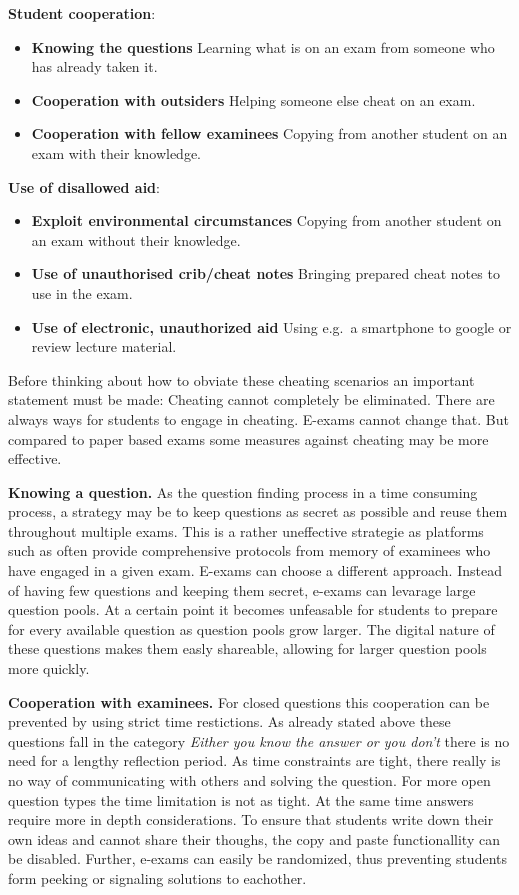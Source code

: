 \textbf{Student cooperation}:

\begin{itemize}
\tightlist
\item
  \textbf{Knowing the questions} Learning what is on an exam from
  someone who has already taken it.
\item
  \textbf{Cooperation with outsiders} Helping someone else cheat on an
  exam.
\item
  \textbf{Cooperation with fellow examinees} Copying from another
  student on an exam with their knowledge.
\end{itemize}

\textbf{Use of disallowed aid}:

\begin{itemize}
\tightlist
\item
  \textbf{Exploit environmental circumstances} Copying from another
  student on an exam without their knowledge.
\item
  \textbf{Use of unauthorised crib/cheat notes} Bringing prepared cheat
  notes to use in the exam.
\item
  \textbf{Use of electronic, unauthorized aid} Using e.g.~a smartphone
  to google or review lecture material.
\end{itemize}

Before thinking about how to obviate these cheating scenarios an
important statement must be made: Cheating cannot completely be
eliminated. There are always ways for students to engage in cheating.
E-exams cannot change that. But compared to paper based exams some
measures against cheating may be more effective.

\textbf{Knowing a question.} As the question finding process in a time
consuming process, a strategy may be to keep questions as secret as
possible and reuse them throughout multiple exams. This is a rather
uneffective strategie as platforms such as often provide comprehensive
protocols from memory of examinees who have engaged in a given exam.
E-exams can choose a different approach. Instead of having few questions
and keeping them secret, e-exams can levarage large question pools. At a
certain point it becomes unfeasable for students to prepare for every
available question as question pools grow larger. The digital nature of
these questions makes them easly shareable, allowing for larger question
pools more quickly.

\textbf{Cooperation with examinees.} For closed questions this
cooperation can be prevented by using strict time restictions. As
already stated above these questions fall in the category \emph{Either
you know the answer or you don't} there is no need for a lengthy
reflection period. As time constraints are tight, there really is no way
of communicating with others and solving the question. For more open
question types the time limitation is not as tight. At the same time
answers require more in depth considerations. To ensure that students
write down their own ideas and cannot share their thoughs, the copy and
paste functionallity can be disabled. Further, e-exams can easily be
randomized, thus preventing students form peeking or signaling solutions
to eachother.

